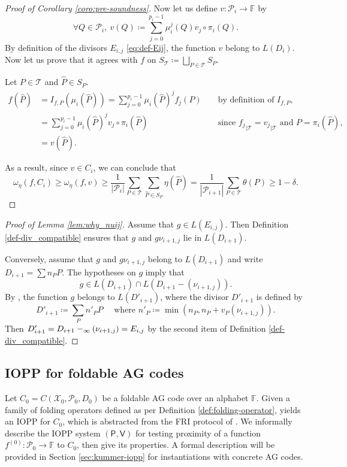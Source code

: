 \documentclass[10pt,a4paper]{article}
\renewcommand\hat{\widehat}
\newcommand\F{\mathbb{F}}
\newcommand\poles[1]{\div_\infty\left( #1 \right)}
\renewcommand{\hat}{\widehat}
\let\div\relax\DeclareMathOperator{\div}{div}
\def\rest#1#2{{{#1}_{|#2}}}
\newcommand\prover{\mathsf{P}}
\newcommand\verifier{\mathsf{V}}
\newcommand{\size}[1]{\left|#1\right|}
\newcommand\calX{\mathcal{X}}
\newcommand\calP{\mathcal{P}}
\newcommand\calT{\mathcal{T}}
\newcommand\mydef{\coloneqq}
\theoremstyle{plain}
\theoremstyle{plain}
\theoremstyle{definition}
\theoremstyle{remark}
\theoremstyle{plain}
\begin{document}
\begin{proof}[Proof of Corollary \ref{coro:pre-soundness}]
	Now let us define $v : \calP_i \rightarrow \F$ by 
	\[\forall Q \in \calP_i, \: v(Q) \mydef \sum_{j=0}^{p_i-1} \mu_i^j(Q) v_j \circ \pi_i(Q).\]
	By definition of the divisors $E_{i,j}$ \eqref{eq:def-Eij}, the function $v$ belong to $L(D_i)$. Now let us prove that it agrees with $f$ on $S_{\calT} \mydef \bigsqcup_{P \in \calT} S_P$.
	
	Let $P \in \calT$ and $\hat{P} \in S_P$. 
	\begin{align*}
		f(\hat P) &= I_{f, P}(\mu_i(\hat P))= \sum_{j=0}^{p_i-1} \mu_i(\hat{P})^j f_j (P) & &\text{ by definition of } I_{f,P},& \\
		&= \sum_{j=0}^{p_i-1} \mu_i(\hat{P})^j v_j \circ \pi_i(\hat{P}) & &\text{ since } \rest{f_j}{\calT} = \rest{v_j}{\calT} \text{ and } P=\pi_i(\hat{P}),& \\
		& = v(\hat P).&& &
	\end{align*}
	
	As a result, since $v \in C_i$, we can conclude that
	\[\omega_\eta(f,C_i) \geq \omega_\eta(f,v) \geq \frac{1}{\size{\calP_i}} \sum_{P \in \calT} \sum_{\hat{P} \in S_P} \eta(\hat{P}) = \frac{1}{\size{\calP_{i+1}}}   \sum_{P \in \calT} \theta(P) \geq 1-\delta. \]
\end{proof}

\begin{proof}[Proof of Lemma \ref{lem:why_nuij}] Assume that $g \in L(E_{i,j})$. Then Definition \ref{def-div_compatible} ensures that $g$ and $g\nu_{i+1,j}$ lie in $L(D_{i+1})$.
	
	Conversely, assume that $g$ and $g\nu_{i+1,j}$ belong to  $L(D_{i+1})$ and write $D_{i+1} = \sum n_P P$. The hypotheses on $g$ imply that \[g \in L(D_{i+1}) \cap L(D_{i+1} - (\nu_{i+1,j})).\] By \cite[Lemma~2.6]{MP93}, the function $g$ belongs to $L(D'_{i+1})$, where the divisor $D'_{i+1}$ is defined by
	\[D'_{i+1} \mydef \sum_P n'_P P \quad \text{ where } n'_P \mydef \min(n_P,n_P+v_P(\nu_{i+1,j})).\]
	Then $D'_{i+1} = D_{i+1} - \poles{\nu_{i+1,j}} = E_{i,j}$ by the second item of Definition \ref{def-div_compatible}.
\end{proof}

\subsection{IOPP for foldable AG codes}\label{subsec:iopp-overview}

Let $C_0 = C(\calX_0, \calP_0, D_0)$ be a foldable AG code over an alphabet $\F$. 
Given a family of folding operators defined as per Definition \ref{def:folding-operator}, \cite{ABN21} yields an IOPP for $C_0$, which is abstracted from the \textsf{FRI} protocol of \cite{BBHR18a}. We informally describe the IOPP system $(\prover, \verifier)$ for testing proximity of a function $f^{(0)} : \calP_0 \rightarrow \F$ to $C_0$, then give its properties. A formal description will be provided in Section \ref{sec:kummer-iopp} for instantiations with concrete AG codes.
\end{document}
